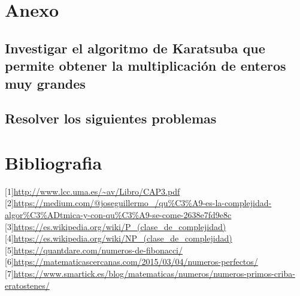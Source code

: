 \documentclass[spanish]{article}
\begin{document}
	\section{Anexo}			
	\subsection{Investigar el algoritmo de Karatsuba que permite obtener la multiplicación de enteros muy grandes}
	\subsection{Resolver los siguientes problemas}
	\section{Bibliografia}
	{[}1{]}\url{http://www.lcc.uma.es/~av/Libro/CAP3.pdf}\\
	{[}2{]}\url{https://medium.com/@joseguillermo_/qu%C3%A9-es-la-complejidad-algor%C3%ADtmica-y-con-qu%C3%A9-se-come-2638e7fd9e8c}\\
		{[}3{]}\url{https://es.wikipedia.org/wiki/P_(clase_de_complejidad)}\\
		{[}4{]}\url{https://es.wikipedia.org/wiki/NP_(clase_de_complejidad)}\\
		{[}5{]}\url{https://quantdare.com/numeros-de-fibonacci/}\\
		{[}6{]}\url{https://matematicascercanas.com/2015/03/04/numeros-perfectos/}\\
		{[}7{]}\url{https://www.smartick.es/blog/matematicas/numeros/numeros-primos-criba-eratostenes/}\\		
	
\end{document}
